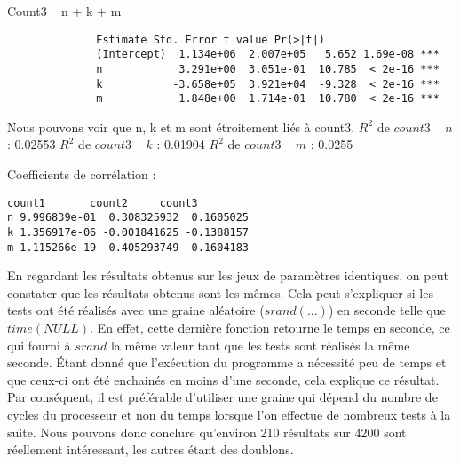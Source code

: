 Count3 ~ n + k + m
\begin{verbatim}
              Estimate Std. Error t value Pr(>|t|)    
              (Intercept)  1.134e+06  2.007e+05   5.652 1.69e-08 ***
              n            3.291e+00  3.051e-01  10.785  < 2e-16 ***
              k           -3.658e+05  3.921e+04  -9.328  < 2e-16 ***
              m            1.848e+00  1.714e-01  10.780  < 2e-16 ***
\end{verbatim}
Nous pouvons voir que n, k et m sont étroitement liés à count3.
$R^2$ de $count3$ ~ $n$ : 0.02553 
$R^2$ de $count3$ ~ $k$ : 0.01904 
$R^2$ de $count3$ ~ $m$ : 0.0255


Coefficients de corrélation :
\begin{verbatim}
count1       count2     count3
n 9.996839e-01  0.308325932  0.1605025
k 1.356917e-06 -0.001841625 -0.1388157
m 1.115266e-19  0.405293749  0.1604183
\end{verbatim}


En regardant les résultats obtenus sur les jeux de paramètres identiques, on peut constater que les résultats obtenus sont les mêmes. Cela peut s'expliquer si les tests ont été réalisés avec une graine aléatoire ($srand(...)$) en seconde telle que $time(NULL)$. En effet, cette dernière fonction retourne le temps en seconde, ce qui fourni à $srand$ la même valeur tant que les tests sont réalisés la même seconde. Étant donné que l'exécution du programme a nécessité peu de temps et que ceux-ci ont été enchainés en moins d'une seconde, cela explique ce résultat. Par conséquent, il est préférable d'utiliser une graine qui dépend du nombre de cycles du processeur et non du temps lorsque l'on effectue de nombreux tests à la suite. Nous pouvons donc conclure qu'environ 210 résultats sur 4200 sont réellement intéressant, les autres étant des doublons.
